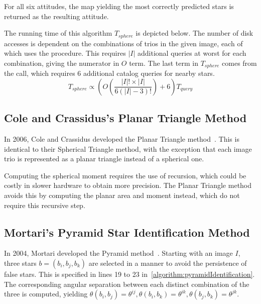 For all six attitudes, the map yielding the most correctly predicted stars is returned as the resulting attitude.

The running time of this algorithm $T_{sphere}$ is depicted below.
The number of disk accesses is dependent on the combinations of trios in the given image, each of which uses the
 procedure.
This requires $|I|$ additional queries at worst for each combination, giving the numerator in $O$ term.
The last term in $T_{sphere}$ comes from the  call, which requires 6 additional catalog queries for
nearby stars.
\begin{equation}\label{eq:sphereComplexity}
    T_{sphere} \propto \left(O \left( \frac{|I|! \times |I|}{6 \left( |I| - 3\right)!} \right) + 6 \right) T_{query}
\end{equation}

\subsection{Cole and Crassidus's Planar Triangle Method}\label{subsec:coleAndCrassidus'sPlanarTriangleMethod}
In 2006, Cole and Crassidus developed the Planar Triangle method~\cite{Planar}.
This is identical to their Spherical Triangle method, with the exception that each image trio is represented as a
planar triangle instead of a spherical one.

Computing the spherical moment requires the use of recursion, which could be costly in slower hardware to obtain more
precision.
The Planar Triangle method avoids this by computing the planar area and moment instead, which do not require this
recursive step.

\subsection{Mortari's Pyramid Star Identification Method}\label{subsec:mortari'sPyramidStarIdentificationMethod}
In 2004, Mortari developed the Pyramid method~\cite{Pyramid}.
Starting with an image $I$, three stars $b = (b_i, b_j, b_k)$ are selected in a manner to avoid the persistence of
false stars.
This is specified in lines 19 to 23 in~\autoref{algorithm:pyramidIdentification}.
The corresponding angular separation between each distinct combination of the three is computed, yielding $\theta
(b_i, b_j) = \theta^{ij}, \theta(b_i, b_k) = \theta^{ik}, \theta(b_j, b_k) = \theta^{jk}$.

